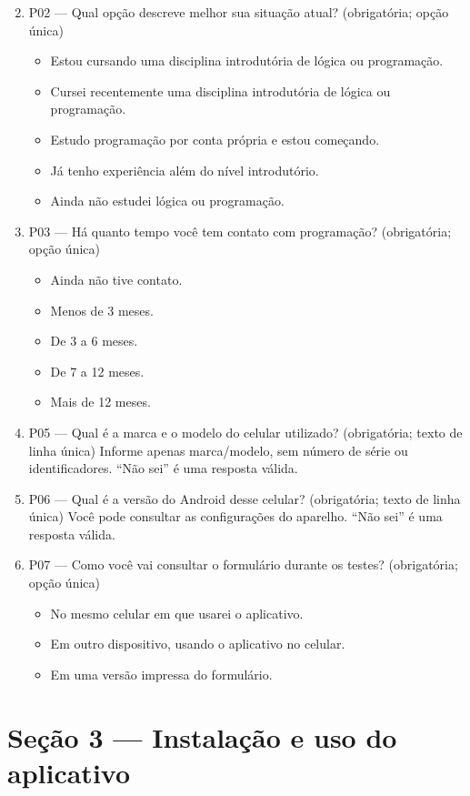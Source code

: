 \begin{enumerate}
\setcounter{enumi}{1}
\item P02 --- Qual opção descreve melhor sua situação atual? (obrigatória; opção única)
  \begin{itemize}
    \item Estou cursando uma disciplina introdutória de lógica ou programação.
    \item Cursei recentemente uma disciplina introdutória de lógica ou programação.
    \item Estudo programação por conta própria e estou começando.
    \item Já tenho experiência além do nível introdutório.
    \item Ainda não estudei lógica ou programação.
  \end{itemize}
\item P03 --- Há quanto tempo você tem contato com programação? (obrigatória; opção única)
  \begin{itemize}
    \item Ainda não tive contato.
    \item Menos de 3 meses.
    \item De 3 a 6 meses.
    \item De 7 a 12 meses.
    \item Mais de 12 meses.
  \end{itemize}
\item P05 --- Qual é a marca e o modelo do celular utilizado? (obrigatória; texto de
  linha única) Informe apenas marca/modelo, sem número de série ou identificadores.
  ``Não sei'' é uma resposta válida.
\item P06 --- Qual é a versão do Android desse celular? (obrigatória; texto de linha
  única) Você pode consultar as configurações do aparelho. ``Não sei'' é uma resposta
  válida.
\item P07 --- Como você vai consultar o formulário durante os testes? (obrigatória;
  opção única)
  \begin{itemize}
    \item No mesmo celular em que usarei o aplicativo.
    \item Em outro dispositivo, usando o aplicativo no celular.
    \item Em uma versão impressa do formulário.
  \end{itemize}
\end{enumerate}

\section*{Seção 3 --- Instalação e uso do aplicativo}

